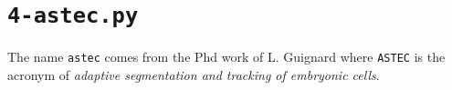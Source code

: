 \section{\texttt{4-astec.py}}
\label{sec:cli:astec}

The name \texttt{astec} comes from the Phd work of L. Guignard \cite{guignard:tel-01278725} where \texttt{ASTEC} is the acronym of \textit{adaptive segmentation and tracking of embryonic cells}.